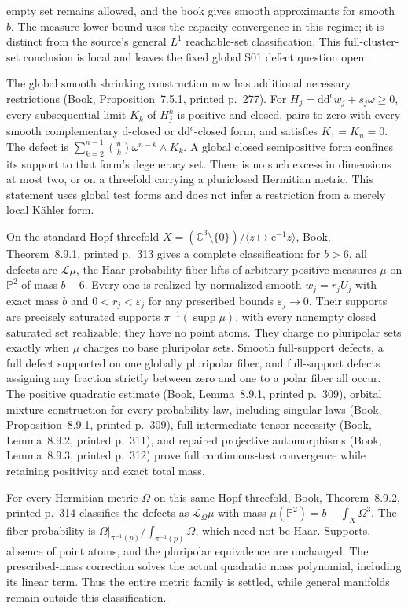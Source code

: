 \documentclass[11pt]{article}
\newcommand{\ddc}{\mathrm d\mathrm d^c}
\begin{document}
empty set remains allowed, and the book gives smooth approximants for smooth $b$. The measure lower bound uses the capacity convergence in this regime; it is distinct from the source's general $L^1$ reachable-set classification. This full-cluster-set conclusion is local and leaves the fixed global S01 defect question open.\par The global smooth shrinking construction now has additional necessary restrictions (Book, Proposition~7.5.1, printed p.~277). For $H_j=\ddc w_j+s_j\omega\geq0$, every subsequential limit $K_k$ of $H_j^k$ is positive and closed, pairs to zero with every smooth complementary $\mathrm d$-closed or $\ddc$-closed form, and satisfies $K_1=K_n=0$. The defect is $\sum_{k=2}^{n-1}\binom nk\omega^{n-k}\wedge K_k$. A global closed semipositive form confines its support to that form's degeneracy set. There is no such excess in dimensions at most two, or on a threefold carrying a pluriclosed Hermitian metric. This statement uses global test forms and does not infer a restriction from a merely local K\"ahler form.\par On the standard Hopf threefold $X=(\mathbb C^3\setminus\{0\})/\langle z\mapsto\mathrm e^{-1}z\rangle$, Book, Theorem~8.9.1, printed p.~313 gives a complete classification: for $b>6$, all defects are $\mathcal L\mu$, the Haar-probability fiber lifts of arbitrary positive measures $\mu$ on $\mathbb P^2$ of mass $b-6$. Every one is realized by normalized smooth $w_j=r_jU_j$ with exact mass $b$ and $0<r_j<\varepsilon_j$ for any prescribed bounds $\varepsilon_j\to0$. Their supports are precisely saturated supports $\pi^{-1}(\operatorname{supp}\mu)$, with every nonempty closed saturated set realizable; they have no point atoms. They charge no pluripolar sets exactly when $\mu$ charges no base pluripolar sets. Smooth full-support defects, a full defect supported on one globally pluripolar fiber, and full-support defects assigning any fraction strictly between zero and one to a polar fiber all occur. The positive quadratic estimate (Book, Lemma~8.9.1, printed p.~309), orbital mixture construction for every probability law, including singular laws (Book, Proposition~8.9.1, printed p.~309), full intermediate-tensor necessity (Book, Lemma~8.9.2, printed p.~311), and repaired projective automorphisms (Book, Lemma~8.9.3, printed p.~312) prove full continuous-test convergence while retaining positivity and exact total mass.\par For every Hermitian metric $\Omega$ on this same Hopf threefold, Book, Theorem~8.9.2, printed p.~314 classifies the defects as $\mathcal L_\Omega\mu$ with mass $\mu(\mathbb P^2)=b-\int_X\Omega^3$. The fiber probability is $\Omega|_{\pi^{-1}(p)}/\int_{\pi^{-1}(p)}\Omega$, which need not be Haar. Supports, absence of point atoms, and the pluripolar equivalence are unchanged. The prescribed-mass correction solves the actual quadratic mass polynomial, including its linear term. Thus the entire metric family is settled, while general manifolds remain outside this classification.
\end{document}
